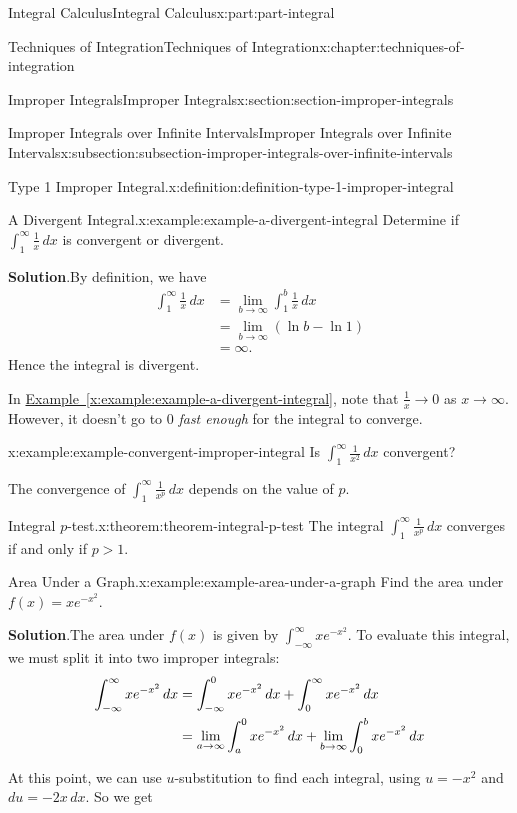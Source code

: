 \documentclass[twoside,10pt,]{tufte-book}
\newcommand{\blocktitlefont}{\relax}
\newcommand{\xreffont}{\relax}
\numberwithin{equation}{part}
\newcommand{\gt}{>}
\begin{document}
\begin{partptx}{Integral Calculus}{}{Integral Calculus}{}{}{x:part:part-integral}
\begin{chapterptx}{Techniques of Integration}{}{Techniques of Integration}{}{}{x:chapter:techniques-of-integration}
\begin{sectionptx}{Improper Integrals}{}{Improper Integrals}{}{}{x:section:section-improper-integrals}
\begin{subsectionptx}{Improper Integrals over Infinite Intervals}{}{Improper Integrals over Infinite Intervals}{}{}{x:subsection:subsection-improper-integrals-over-infinite-intervals}
\begin{definition}{Type 1 Improper Integral.}{x:definition:definition-type-1-improper-integral}
\begin{equation*}
\end{equation*}
%
\end{definition}
\begin{example}{A Divergent Integral.}{x:example:example-a-divergent-integral}%
Determine if \(\int_{1}^{\infty}\frac{1}{x}\,dx\) is convergent or divergent.%
\par\smallskip%
\noindent\textbf{\blocktitlefont Solution}.\hypertarget{g:solution:idm35150999471808}{}\quad{}By definition, we have%
\begin{align*}
\int_{1}^{\infty}\frac{1}{x}\,dx & = \lim_{b\to\infty}\int_{1}^{b}\frac{1}{x}\,dx \\
& = \lim_{b\to\infty}(\ln b - \ln 1) \\
& = \infty. 
\end{align*}
Hence the integral is divergent.%
\end{example}
In \hyperref[x:example:example-a-divergent-integral]{Example~{\xreffont\ref{x:example:example-a-divergent-integral}}}, note that \(\frac{1}{x}\to0\) as \(x\to\infty\). However, it doesn't go to \(0\) \emph{fast enough} for the integral to converge.%
\begin{example}{}{x:example:example-convergent-improper-integral}%
Is \(\int_{1}^{\infty}\frac{1}{x^{2}}\,dx\) convergent?%
\end{example}
The convergence of \(\int_{1}^{\infty}\frac{1}{x^{p}}\,dx\) depends on the value of \(p\).%
\begin{theorem}{Integral \(p\)-test.}{}{x:theorem:theorem-integral-p-test}%
The integral \(\int_{1}^{\infty}\frac{1}{x^{p}}\,dx\) converges if and only if \(p \gt 1\).%
\end{theorem}
\begin{example}{Area Under a Graph.}{x:example:example-area-under-a-graph}%
Find the area under \(f(x) = xe^{-x^{2}}\).%
\par\smallskip%
\noindent\textbf{\blocktitlefont Solution}.\hypertarget{g:solution:idm35150999462336}{}\quad{}The area under \(f(x)\) is given by \(\int_{-\infty}^{\infty}xe^{-x^{2}}\). To evaluate this integral, we must split it into two improper integrals:%
\begin{align*}
\int_{-\infty}^{\infty}xe^{-x^{2}}\,dx & = \int_{-\infty}^{0}xe^{-x^{2}}\,dx + \int_{0}^{\infty}xe^{-x^{2}}\,dx \\
& = \lim_{a\to\-\infty}\int_{a}^{0}xe^{-x^{2}}\,dx + \lim_{b\to\infty}\int_{0}^{b}xe^{-x^{2}}\,dx 
\end{align*}
%
\par
At this point, we can use \(u\)-substitution to find each integral, using \(u = -x^{2}\) and \(du = -2x\,dx\). So we get%

\end{example}
\end{subsectionptx}
\end{sectionptx}
\end{chapterptx}
\end{partptx}
\end{document}
